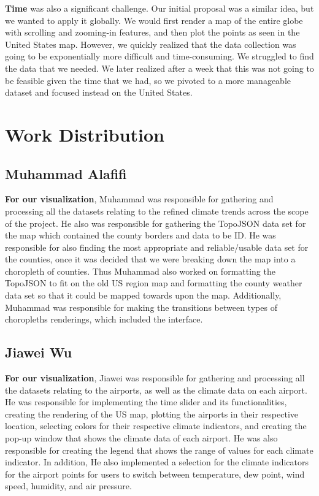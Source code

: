 \documentclass[10pt,twocolumn,twoside]{opticajnl}
\begin{document}
\textbf{Time} was also a significant challenge. Our initial proposal was a similar idea, but we wanted to apply it globally. We would first render a map of the entire globe with scrolling and zooming-in features, and then plot the points as seen in the United States map. However, we quickly realized that the data collection was going to be exponentially more difficult and time-consuming. We struggled to find the data that we needed. We later realized after a week that this was not going to be feasible given the time that we had, so we pivoted to a more manageable dataset and focused instead on the United States.

\section {Work Distribution}

\subsection {Muhammad Alafifi}
\textbf{For our visualization}, Muhammad was responsible for gathering and processing all the datasets relating to the refined climate trends across the scope of the project. He also was responsible for gathering the TopoJSON data set for the map which contained the county borders and data to be ID. He was responsible for also finding the most appropriate and reliable/usable data set for the counties, once it was decided that we were breaking down the map into a choropleth of counties. Thus Muhammad also worked on formatting the TopoJSON to fit on the old US region map and formatting the county weather data set so that it could be mapped towards upon the map. Additionally, Muhammad was responsible for making the transitions between types of choropleths renderings, which included the interface.

\subsection {Jiawei Wu}

\textbf{For our visualization}, Jiawei was responsible for gathering and processing all the datasets relating to the airports, as well as the climate data on each airport. He was responsible for implementing the time slider and its functionalities, creating the rendering of the US map, plotting the airports in their respective location, selecting colors for their respective climate indicators, and creating the pop-up window that shows the climate data of each airport. He was also responsible for creating the legend that shows the range of values for each climate indicator. In addition, He also implemented a selection for the climate indicators for the airport points for users to switch between temperature, dew point, wind speed, humidity, and air pressure.
\end{document}
